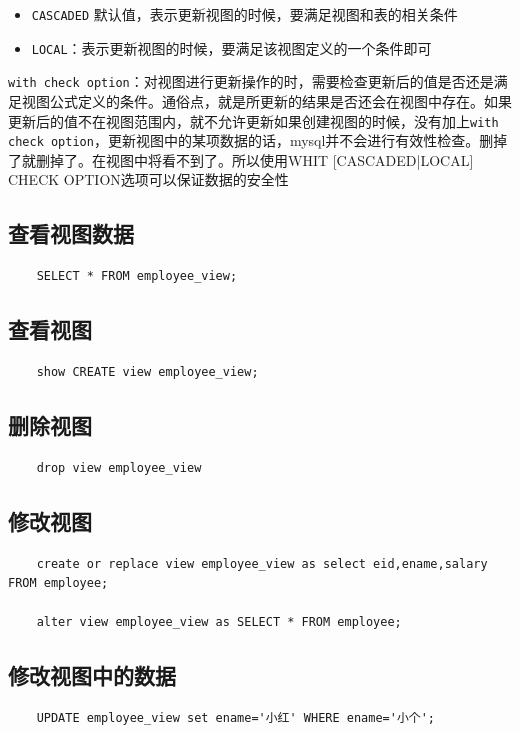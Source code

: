 \documentclass[UTF8,a4paper,12pt]{ctexbook}
\begin{document}
			\begin{itemize}
				\item \verb|CASCADED| 默认值，表示更新视图的时候，要满足视图和表的相关条件
				\item \verb|LOCAL|：表示更新视图的时候，要满足该视图定义的一个条件即可
			\end{itemize}
			
			\verb|with check option|：对视图进行更新操作的时，需要检查更新后的值是否还是满足视图公式定义的条件。通俗点，就是所更新的结果是否还会在视图中存在。如果更新后的值不在视图范围内，就不允许更新如果创建视图的时候，没有加上\verb|with check option|，更新视图中的某项数据的话，mysql并不会进行有效性检查。删掉了就删掉了。在视图中将看不到了。所以使用WHIT [CASCADED|LOCAL] CHECK OPTION选项可以保证数据的安全性
			
		\subsection{查看视图数据}
			\begin{lstlisting}
	SELECT * FROM employee_view;		
			\end{lstlisting}		
		
		\subsection{查看视图}	
			\begin{lstlisting}
	show CREATE view employee_view;		
			\end{lstlisting}		
		
		\subsection{删除视图}
			\begin{lstlisting}
	drop view employee_view		
			\end{lstlisting}		
		
		\subsection{修改视图}
			\begin{lstlisting}
	create or replace view employee_view as select eid,ename,salary FROM employee;
	
	alter view employee_view as SELECT * FROM employee;		
			\end{lstlisting}		
		
		\subsection{修改视图中的数据}
			\begin{lstlisting}
	UPDATE employee_view set ename='小红' WHERE ename='小个';		
			\end{lstlisting}	
		
\end{document}
